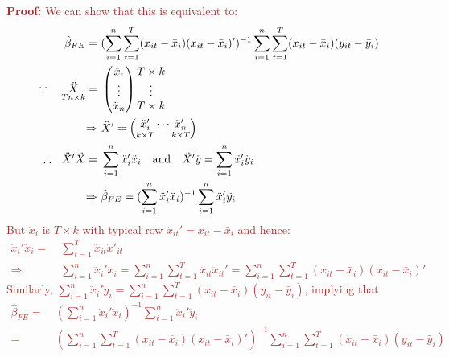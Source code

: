 \documentclass[a4paper,twoside,11pt]{article}
\begin{document}
\textcolor{Brown}{
\textbf{Proof:}
We can show that this is equivalent to:
\begin{equation*}
\begin{aligned}
\hat{\beta}_{FE} =& \  (\sum^n_{i=1} \sum^T_{t=1} (x_{it} - \bar x_i ) (x_{it} - \bar x_i )')^{-1} \sum^n_{i=1} \sum^T_{t=1} (x_{it} - \bar x_i ) (y_{it} - \bar y_i) \\
\because \ \ \ \underset{Tn \times k}{\ddot X} =& \  \begin{pmatrix}
\ddot x_i \\ \vdots \\ \ddot x_n 
\end{pmatrix}
\begin{matrix} 
T \times k \\ \vdots \\ T \times k
\end{matrix} \\
\Rightarrow& \  \ddot X' = \begin{pmatrix}
\underset{k \times T}{\ddot x_i'} \cdots \underset{k \times T}{\ddot x_n'}
\end{pmatrix}
\\
\therefore \ \ \ddot X' \ddot X =& \  \sum^n_{i=1} \ddot x_i' \ddot x_i \ \ \ \textmd{and} \ \ \ \ddot X' \ddot y = \sum^n_{i=1} \ddot x_i' \ddot y_i \\
\Rightarrow& \  \hat{\beta}_{FE} = (\sum^n_{i=1} \ddot x_i' \ddot x_i)^{-1} \sum^n_{i=1} \ddot x_i' \ddot y_i
\end{aligned}
\end{equation*}
But $\ddot x_i$ is $T \times k$ with typical row $\ddot x_{it}' = x_{it} - \bar x_i$ and hence:
\begin{equation*}
\begin{aligned}
\ddot x_i' \ddot x_i =& \  \sum^T_{t=1} \ddot x_{it} \ddot x'_{it} \\
\Rightarrow& \ \sum^n_{i=1} \ddot x_i' \ddot x_i = \sum^n_{i=1} \sum^T_{t=1} \ddot x_{it} \ddot x_{it}' = \sum^n_{i=1} \sum^{T}_{t=1} (x_{it} - \bar x_i) (x_{it} - \bar x_i)'
\end{aligned}
\end{equation*}
Similarly, $\sum^n_{i=1} \ddot x_i' \ddot y_i = \sum^n_{i=1} \sum^T_{t=1} (x_{it} - \bar x_i) (y_{it} - \bar y_i)$, implying that 
\begin{equation*}
\begin{aligned}
\hat{\beta}_{FE} =& \ (\sum^n_{i=1} \ddot x_i' \ddot x_i )^{-1} \sum^n_{i=1} \ddot x_i' \ddot y_i \\
=& \ (\sum^n_{i=1} \sum^T_{t=1} (x_{it} - \bar x_i ) (x_{it} - \bar x_i)')^{-1} \sum^n_{i=1} \sum^T_{t=1} (x_{it} - \bar x_i ) (y_{it} - \bar y_i)
\end{aligned}
\end{equation*}}
\end{document}
